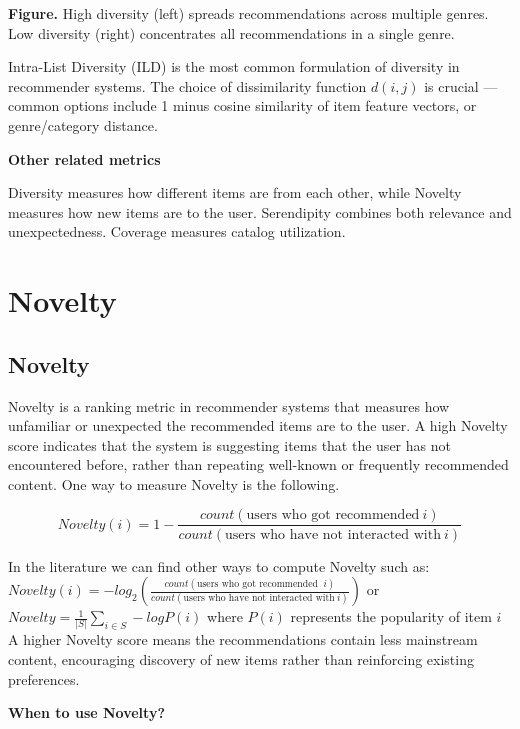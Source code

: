 \textbf{Figure.} High diversity (left) spreads recommendations across multiple genres. Low diversity (right) concentrates all recommendations in a single genre.

{Intra-List Diversity (ILD) is the most common formulation of diversity in recommender systems. The choice of dissimilarity function $d(i,j)$
is crucial — common options include 1 minus cosine similarity of item feature vectors, or genre/category distance.}

\textbf{Other related metrics}

Diversity measures how different items are from each other, while Novelty measures how new items are to the user.
Serendipity combines both relevance and unexpectedness. Coverage measures catalog utilization.

\clearpage
\thispagestyle{rankingstyle}
\section{Novelty}
\subsection{Novelty}

Novelty is a ranking metric in recommender systems that measures how unfamiliar or unexpected the recommended items are to
the user. A high Novelty score indicates that the system is suggesting items that the user has not encountered before,
rather than repeating well-known or frequently recommended content. One way to measure Novelty is the following.

\begin{center}
    \[
        Novelty(i) = 1 - \frac{count(\text{users who got recommended} \: i)}{count(\text{users who have not interacted with} \: i)}
    \]
\end{center}

In the literature we can find other ways to compute Novelty such as: $Novelty(i) = -log_2 \left( \frac{count(\text{users who got recommended } \: i)}{count(\text{users who have not interacted with} \: i)} \right)$
or $Novelty = \frac{1}{|S|} \sum_{i \in S} -log P(i)$ where $P(i)$ represents the popularity of item \( i \)
A higher Novelty score means the recommendations contain less mainstream content, encouraging discovery of new items rather
than reinforcing existing preferences.

\textbf{When to use Novelty?}


